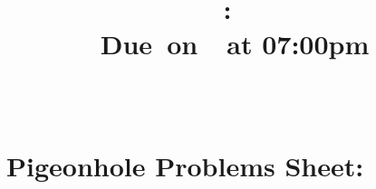 \documentclass{article}
\title{
	\vspace{2in}
	\textmd{\textbf{\hmwkClass:\ \hmwkTitle}}\\
	\normalsize\vspace{0.1in}\small{Due\ on\ \hmwkDueDate\ at 07:00pm}\\
	\vspace{0.1in}\large{\textit{\hmwkClassInstructor\ \hmwkClassTime}}
	\vspace{3in}
}
\author{\hmwkAuthorName}
\date{}
\begin{document}
	\maketitle
	
	\pagebreak
	
	
	\section*{Pigeonhole Problems Sheet:}
	
\end{document}
